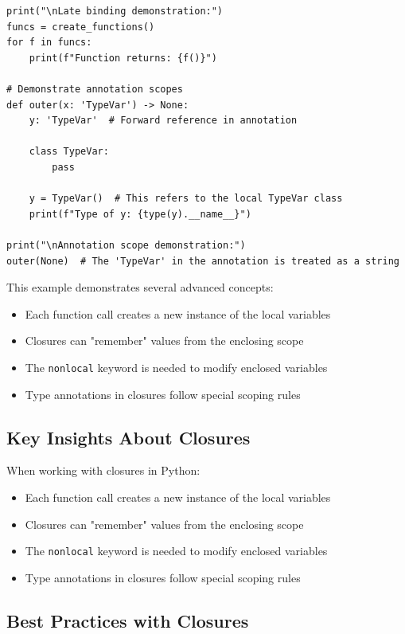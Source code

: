 \documentclass[12pt,letterpaper]{article}
\newcommand{\code}[1]{\texttt{\textcolor{accentColor}{#1}}}
\newenvironment{macterminal}{%
    \begin{mdframed}[
        linecolor=terminalFrame,
        backgroundcolor=terminalBg,
        roundcorner=5pt,
        skipabove=5pt,
        skipbelow=5pt,
        linewidth=1pt,
        innertopmargin=5pt,
        frametitle={%
            \tikz[baseline=(current bounding box.east), outer sep=0pt]{
                \fill[red!80!black] (0,0) circle (5pt);
                \fill[yellow!80!black] (0.7,0) circle (5pt);
                \fill[green!70!black] (1.4,0) circle (5pt);
            }
        },
        frametitlealignment=\raggedright,
        frametitleaboveskip=8pt,
        frametitlebelowskip=0pt,
    ]
}{%
    \end{mdframed}%
}
\begin{document}
\begin{macterminal}
\begin{lstlisting}
print("\nLate binding demonstration:")
funcs = create_functions()
for f in funcs:
    print(f"Function returns: {f()}")

# Demonstrate annotation scopes
def outer(x: 'TypeVar') -> None:
    y: 'TypeVar'  # Forward reference in annotation
    
    class TypeVar:
        pass
    
    y = TypeVar()  # This refers to the local TypeVar class
    print(f"Type of y: {type(y).__name__}")

print("\nAnnotation scope demonstration:")
outer(None)  # The 'TypeVar' in the annotation is treated as a string
\end{lstlisting}
\end{macterminal}

This example demonstrates several advanced concepts:

\begin{itemize}
    \item Each function call creates a new instance of the local variables
    \item Closures can "remember" values from the enclosing scope  
    \item The \code{nonlocal} keyword is needed to modify enclosed variables
    \item Type annotations in closures follow special scoping rules
\end{itemize}

\subsection{Key Insights About Closures}

When working with closures in Python:

\begin{itemize}
    \item Each function call creates a new instance of the local variables
    \item Closures can "remember" values from the enclosing scope
    \item The \code{nonlocal} keyword is needed to modify enclosed variables
    \item Type annotations in closures follow special scoping rules
\end{itemize}

\subsection{Best Practices with Closures}
\end{document}
